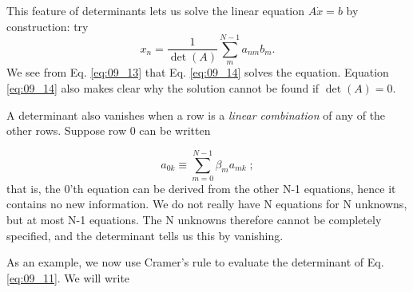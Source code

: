 This feature of determinants lets us solve the linear equation
$A \dot x = b$ by construction: try
\begin{equation}
    x_n=\frac{1}{\det(A)}\sum_{m}^{N-1}a_{nm}b_m.\label{eq:09_14}
\end{equation}
We see from Eq. \ref{eq:09_13} that Eq. \ref{eq:09_14} solves the equation. Equation \ref{eq:09_14}
also makes clear why the solution cannot be found if $\det(A) = 0$.

A determinant also vanishes when a row is a \textit{linear combination}
of any of the other rows. Suppose row 0 can be written

\begin{equation}
    a_{0k}\equiv    \sum_{m=0}^{N-1}\beta _m a_{mk}\;;\nonumber
\end{equation}
that is, the 0'th equation can be derived from the other N-1
equations, hence it contains no new information. We do not really
have N equations for N unknowns, but at most N-1 equations. The
N unknowns therefore cannot be completely specified, and the
determinant tells us this by vanishing.

As an example, we now use Cramer's rule to evaluate the determinant of Eq. \ref{eq:09_11}. We will write

